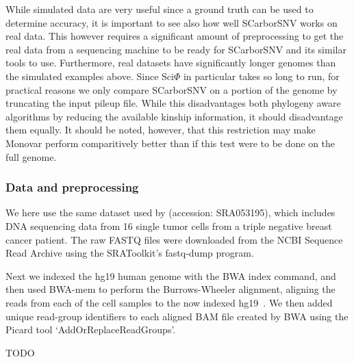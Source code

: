 \documentclass[../../main.tex]{subfiles}
\begin{document}
While simulated data are very useful since a ground truth can be used to determine accuracy, it is important to see also how well SCarborSNV works on real data.
This however requires a significant amount of preprocessing to get the real data from a sequencing machine to be ready for SCarborSNV and its similar tools to use.
Furthermore, real datasets have significantly longer genomes than the simulated examples above.
Since Sci$\Phi$ in particular takes so long to run, for practical reasons we only compare SCarborSNV on a portion of the genome by truncating the input pileup file.
While this disadvantages both phylogeny aware algorithms by reducing the available kinship information, it should disadvantage them equally.
It should be noted, however, that this restriction may make Monovar perform comparitively better than if this test were to be done on the full genome.

\subsubsection*{Data and preprocessing}
We here use the same dataset used by \cite{sciphi} (accession: SRA053195), which includes DNA sequencing data from 16 single tumor cells from a triple negative breast cancer patient.
The raw FASTQ files were downloaded from the NCBI Sequence Read Archive using the SRAToolkit's fastq-dump program.

Next we indexed the hg19 human genome with the BWA index command, and then used BWA-mem to perform the Burrows-Wheeler alignment, aligning the reads from each of the cell samples to the now indexed hg19~\cite{BWAMEM}.
We then added unique read-group identifiers to each aligned BAM file created by BWA using the Picard tool `AddOrReplaceReadGroups'.

\large{TODO}
\end{document}
